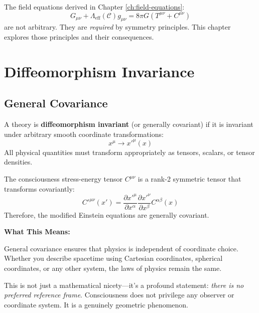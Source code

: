 The field equations derived in Chapter \ref{ch:field-equations}:
\begin{equation}
G_{\mu\nu} + \Lambda_{\text{eff}}(\mathcal{C}) g_{\mu\nu} = 8\pi G \left( T^{\mu\nu} + C^{\mu\nu} \right)
\end{equation}
are not arbitrary. They are \textit{required} by symmetry principles. This chapter explores those principles and their consequences.

\section{Diffeomorphism Invariance}

\subsection{General Covariance}

\begin{definition}\label{def:diffeomorphism-invariance}
A theory is \textbf{diffeomorphism invariant} (or generally covariant) if it is invariant under arbitrary smooth coordinate transformations:
\begin{equation}
x^\mu \to x'^\mu(x)
\end{equation}
All physical quantities must transform appropriately as tensors, scalars, or tensor densities.
\end{definition}

\begin{theorem}\label{thm:consciousness-covariance}
The consciousness stress-energy tensor $C^{\mu\nu}$ is a rank-2 symmetric tensor that transforms covariantly:
\begin{equation}
C'^{\mu\nu}(x') = \frac{\partial x'^\mu}{\partial x^\alpha} \frac{\partial x'^\nu}{\partial x^\beta} C^{\alpha\beta}(x)
\end{equation}
Therefore, the modified Einstein equations are generally covariant.
\end{theorem}

\begin{level1}
\textbf{What This Means:}

General covariance ensures that physics is independent of coordinate choice. Whether you describe spacetime using Cartesian coordinates, spherical coordinates, or any other system, the laws of physics remain the same.

This is not just a mathematical nicety---it's a profound statement: \textit{there is no preferred reference frame}. Consciousness does not privilege any observer or coordinate system. It is a genuinely geometric phenomenon.
\end{level1}

